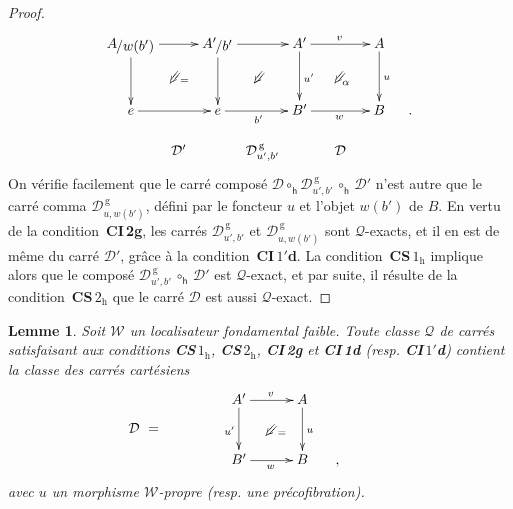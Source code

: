 \documentclass[francais]{smfart}
\theoremstyle{plain}
\newtheorem{lemme}[thm]{Lemme}
\theoremstyle{remark}
\theoremstyle{definition}
\numberwithin{equation}{thm}
\begin{document}
\begin{proof}
\[
\xymatrixrowsep{1.1pc}
\xymatrixcolsep{.9pc}
\UseAllTwocells
\xymatrix{
{\mathchoice {{A}\raise -1.8pt\vbox{\hbox{$\kern -.8pt/{w(b')}$}}} {{A}\raise -1.8pt\vbox{\hbox{$\kern -.8pt/{w(b')}$}}\kern .8pt} {{A}\raise -1.8pt\vbox{\hbox{$\scriptstyle\kern -.8pt /{w(b')}$}}} {{A}\raise -1.8pt\vbox{\hbox{$\scriptscriptstyle\kern -.8pt /{w(b')}$}}} }\ddrrcompositemap<\omit>{}
  \ar[rr]^{}
  \ar[dd]_{}
&&{\mathchoice {{A'}\raise -1.8pt\vbox{\hbox{$\kern -.8pt/{b'}$}}} {{A'}\raise -1.8pt\vbox{\hbox{$\kern -.8pt/{b'}$}}\kern .8pt} {{A'}\raise -1.8pt\vbox{\hbox{$\scriptstyle\kern -.8pt /{b'}$}}} {{A'}\raise -1.8pt\vbox{\hbox{$\scriptscriptstyle\kern -.8pt /{b'}$}}} }\ddrrcompositemap<\omit>{}
  \ar[rr]^{}
  \ar[dd]^(.55){\hskip -30pt =}
&&A'\ar[dd]^{u'}
  \ddrrcompositemap<\omit>{\alpha}
  \ar[rr]^{v}
&&A\ar[dd]^u
\\
\\
e\ar[rr]_{}
&&e\ar[rr]_{b'}
&&B'\ar[rr]_{w}
&&B
&.
\\
&\kern -9pt\mathcal D'\kern -9pt
&&\kern -8pt \mathcal D^{\mathrm{\,g}}_{u',b'}\kern -8pt
&&\kern 3pt\mathcal D \kern 3pt
}
\]
On vérifie facilement que le carré composé $\mathcal D{\circ^{}_{\mathsf h}}\mathcal D^{\mathrm{\,g}}_{u',b'}\,{\circ^{}_{\mathsf h}}\,\mathcal D'$ n'est autre que le carré comma $\mathcal D^{\mathrm{\,g}}_{u,w(b')}$, défini par le foncteur $u$ et l'objet $w(b')$ de $B$. En vertu de la condition~\textbf{CI\,2g}, les carrés $\mathcal D^{\mathrm{\,g}}_{u',b'}$ et $\mathcal D^{\mathrm{\,g}}_{u,w(b')}$ sont ${\mathcal{Q}}${\nobreakdash}-exacts, et il en est de même du carré $\mathcal D'$, grâce à la condition~\textbf{\boldmath CI\,$1'$d}. La condition~\textbf{\boldmath CS\,$1_{\mathrm h}$} implique alors que le composé $\mathcal D^{\mathrm{\,g}}_{u',b'}\,{\circ^{}_{\mathsf h}}\,\mathcal D'$ est ${\mathcal{Q}}${\nobreakdash}-exact, et par suite, il résulte de la condition~\textbf{\boldmath CS\,$2_{\mathrm h}$} que le carré $\mathcal D$ est aussi ${\mathcal{Q}}${\nobreakdash}-exact.
\end{proof}

\begin{lemme} \label{condsuffexpropre}
Soit ${\mathcal{W}}$ un localisateur fondamental faible.
Toute classe ${\mathcal{Q}}$ de carrés satisfaisant aux conditions \emph{\textbf{\boldmath CS\,$1_{\mathrm h}$}, \textbf{\boldmath CS\,$2_{\mathrm h}$}, \textbf{CI\,2g} \emph{et} \textbf{CI\,1d} (\emph{resp}. \textbf{\boldmath CI\,$1'$d})} contient la classe des carrés cartésiens
\[
\mathcal{D}\ =\quad
\raise 23pt
\vbox{
\UseTwocells
\xymatrixcolsep{2.5pc}
\xymatrixrowsep{2.4pc}
\xymatrix{
&A'\ar[d]_{u'}\ar[r]^{v}
\drtwocell<\omit>{}
&A\ar[d]^{u}\ar@<-2ex>@{}[d]_(.55){=}
\\
&B'\ar[r]_{w}
&B
&\hskip -30pt,
}
}\qquad
\]
avec $u$ un morphisme ${\mathcal{W}}${\nobreakdash}-propre \emph{(}resp. une précofibration\emph{)}.
\end{lemme}
\end{document}
